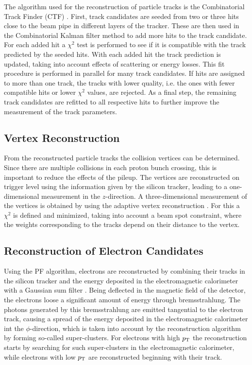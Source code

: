 \noindent The algorithm used for the reconstruction of particle tracks is the Combinatorial Track Finder (CTF) \cite{ctf1,ctf2}. First, track candidates are seeded from two or three hits close to the beam pipe in different layers of the tracker. These are then used in the Combinatorial Kalman filter method \cite{kalman} to add more hits to the track candidate. For each added hit a $\chi^2$ test is performed to see if it is compatible with the track predicted by the seeded hits. With each added hit the track prediction is updated, taking into account effects of scattering or energy losses. This fit procedure is performed in parallel for many track candidates. If hits are assigned to more than one track, the tracks with lower quality, i.e. the ones with fewer compatible hits or lower $\chi^2$ values, are rejected. As a final step, the remaining track candidates are refitted to all respective hits to further improve the measurement of the track parameters.

\subsection{Vertex Reconstruction}
From the reconstructed particle tracks the collision vertices can be determined. Since there are multiple collisions in each proton bunch crossing, this is important to reduce the effects of the pileup. The vertices are reconstructed on trigger level using the information given by the silicon tracker, leading to a one-dimensional measurement in the $z$-direction. A three-dimensional measurement of the vertices is obtained by using the adaptive vertex reconstruction \cite{vertexreco}. For this a $\chi^2$ is defined and minimized, taking into account a beam spot constraint, where the weights corresponding to the tracks depend on their distance to the vertex.
\subsection{Reconstruction of Electron Candidates}
Using the PF algorithm, electrons are reconstructed by combining their tracks in the silicon tracker and the energy deposited in the electromagnetic calorimeter with a Gaussian sum filter \cite{elreco1}. Being deflected in the magnetic field of the detector, the electrons loose a significant amount of energy through bremsstrahlung. The photons generated by this bremsstrahlung are emitted tangential to the electron track, causing a spread of the energy deposited in the electromagnetic calorimeter int the $\phi$-direction, which is taken into account by the reconstruction algorithm by forming so-called super-clusters. For electrons with high $p_{\rm T}$ the reconstruction starts by searching for such super-clusters in the electromagnetic calorimeter, while electrons with low $p_{\rm T}$ are reconstructed beginning with their track.\\


